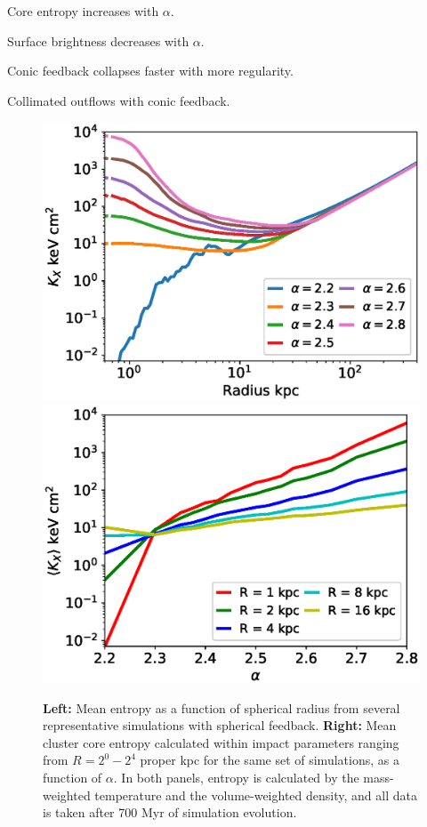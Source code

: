 \documentclass[iop,apjl, twocolappendix]{emulateapj}   %
\begin{document}
\textbullet Core entropy increases with $\alpha$.

\textbullet Surface brightness decreases with $\alpha$.

\textbullet Conic feedback collapses faster with more regularity.

\textbullet Collimated outflows with conic feedback.

\label{sec:results}
\begin{figure}
	\begin{center}
		\includegraphics[width=0.49\linewidth]{figures/spherical/entropyVradius.eps}
		\includegraphics[width=0.49\linewidth]{figures/spherical/entropyValpha.eps}
	\end{center}
	\caption{
    \label{fig:sphericalEntropy}
		\textbf{Left:}  Mean entropy as a function of spherical radius from
	several representative simulations with spherical feedback.  \textbf{Right:} Mean cluster core
	entropy calculated within impact parameters ranging from $R = 2^0 - 2^4$ proper
	kpc for the same set of simulations, as a function of $\alpha$.  In both
	panels, entropy is calculated by the mass-weighted temperature and the
	volume-weighted density, and all data is taken after 700 Myr of simulation
	evolution.}
\end{figure}
\end{document}
